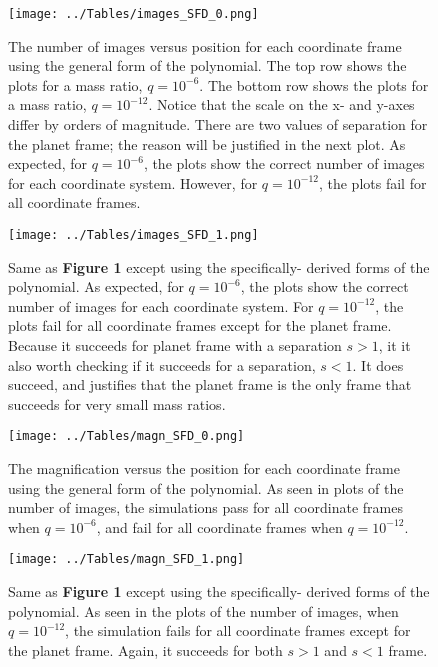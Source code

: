 \documentclass{article}
\begin{document}
\begin{figure}
	\texttt{[image: ../Tables/images\_SFD\_0.png]}
	\caption{The number of images versus position for each coordinate
	frame using the general form of the polynomial. The top row shows
	the plots for a mass ratio, $q=10^{-6}$. The bottom row shows the
	plots for a mass ratio, $q=10^{-12}$. Notice that the scale on the
	x- and y-axes differ by orders of magnitude. There are two values of
	separation for the planet frame; the reason will be justified in
	the next plot. As expected, for $q=10^{-6}$, the plots show the
	correct number of images for each coordinate system. However, for
	$q=10^{-12}$, the plots fail for all coordinate frames.}

	\vspace*{\floatsep}

	\texttt{[image: ../Tables/images\_SFD\_1.png]}
	\caption{Same as \textbf{Figure 1} except using the specifically-
	derived forms of the polynomial. As
	expected, for $q=10^{-6}$, the plots show the correct number of
	images for each coordinate system. For $q=10^{-12}$, the plots fail
	for all coordinate frames except for the planet frame. Because it
	succeeds for planet frame with a separation $s>1$, it it also worth
	checking if it succeeds for a separation, $s<1$. It does succeed,
	and justifies that the planet frame is the only frame that succeeds
	for very small mass ratios.}
\end{figure}

\begin{figure}
	\texttt{[image: ../Tables/magn\_SFD\_0.png]}
	\caption{The magnification versus the position for each coordinate
	frame using the general form of the polynomial. As seen in plots
	of the number of images, the simulations pass for all coordinate
	frames when $q=10^{-6}$, and fail for all coordinate frames when
	$q=10^{-12}$.}

	\vspace*{\floatsep}

	\texttt{[image: ../Tables/magn\_SFD\_1.png]}
	\caption{Same as \textbf{Figure 1} except using the specifically-
	derived forms of the polynomial. As
	seen in the plots of the number of images, when $q=10^{-12}$, the
	simulation fails for all coordinate frames except for the planet
	frame. Again, it succeeds for both $s>1$ and $s<1$ frame.}
\end{figure}

\end{document}

